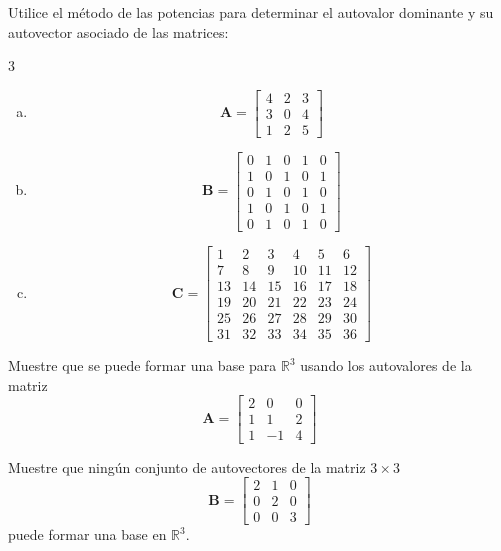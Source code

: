 \documentclass[11pt]{article}
\begin{document}
\begin{question}
	Utilice el método de las potencias para determinar el autovalor dominante y su autovector asociado de las matrices:
	\begin{multicols}{3}
		\begin{enumerate}[a)]
			\item
			      \[ \bm{A} = \begin{bmatrix} 4 & 2 & 3 \\ 3 & 0 & 4 \\ 1 & 2 & 5 \end{bmatrix} \]
			\item
			      \[ \bm{B} = \begin{bmatrix} 0 & 1 & 0 & 1 & 0 \\ 1 & 0 & 1 & 0 & 1 \\ 0 & 1 & 0 & 1 & 0 \\ 1 & 0 & 1 & 0 & 1 \\ 0 & 1 & 0 & 1 & 0 \end{bmatrix} \]
			\item
			      \[ \bm{C} = \begin{bmatrix}
					      1  & 2  & 3  & 4  & 5  & 6  \\
					      7  & 8  & 9  & 10 & 11 & 12 \\
					      13 & 14 & 15 & 16 & 17 & 18 \\
					      19 & 20 & 21 & 22 & 23 & 24 \\
					      25 & 26 & 27 & 28 & 29 & 30 \\
					      31 & 32 & 33 & 34 & 35 & 36
				      \end{bmatrix} \]

		\end{enumerate}
	\end{multicols}
\end{question}

\begin{question} %
	Muestre que se puede formar una base para $\mathbb{R}^3$ usando los autovalores de la matriz
	\[ \bm{A} = \begin{bmatrix} 2 & 0  & 0 \\
		                1 & 1  & 2 \\
		                1 & -1 & 4\end{bmatrix} \]
\end{question}

\begin{question} %
	Muestre que ningún conjunto de autovectores de la matriz $3 \times 3$
	\[ \bm{B} = \begin{bmatrix} 2 & 1 & 0 \\
		                0 & 2 & 0 \\
		                0 & 0 & 3\end{bmatrix} \]
	puede formar una base en $\mathbb{R}^3$.
\end{question}
\end{document}
